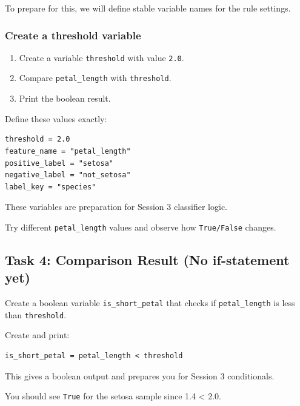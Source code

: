 To prepare for this, we will define stable variable names for the rule settings.

\subsubsection{Create a threshold variable}
\begin{enumerate}
    \item Create a variable \texttt{threshold} with value \texttt{2.0}.
    \item Compare \texttt{petal\_length} with \texttt{threshold}.
    \item Print the boolean result.
\end{enumerate}

Define these values exactly:
\begin{verbatim}
threshold = 2.0
feature_name = "petal_length"
positive_label = "setosa"
negative_label = "not_setosa"
label_key = "species"
\end{verbatim}

These variables are preparation for Session 3 classifier logic.

\noindent
Try different \texttt{petal\_length} values and observe how \texttt{True/False} changes.

\subsection{Task 4: Comparison Result (No if-statement yet)}

\begin{tcolorbox}[title=Task 5: Comparing with threshold]
Create a boolean variable \texttt{is\_short\_petal} that checks if \texttt{petal\_length} is less than \texttt{threshold}. 
\end{tcolorbox}


Create and print:
\begin{verbatim}
is_short_petal = petal_length < threshold
\end{verbatim}

This gives a boolean output and prepares you for Session 3 conditionals.

\begin{tcolorbox}[title=Checkpoint]
You should see \texttt{True} for the setosa sample since 1.4 < 2.0.
\end{tcolorbox}


